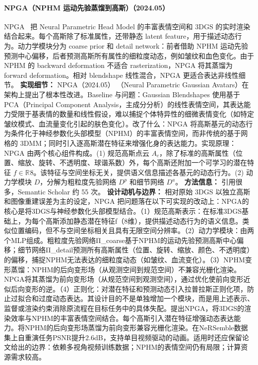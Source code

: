 \paragraph{NPGA（NPHM 运动先验蒸馏到高斯）（2024.05）}
NPGA~\cite{2405_19331} 把 Neural Parametric Head Model 的丰富表情空间和 3DGS 的实时渲染结合起来。每个高斯除了标准属性，还带静态 latent feature，用于描述动态行为。动力学模块分为 coarse prior 和 detail network：前者借助 NPHM 运动先验预测中心偏移，后者预测高斯所有属性的细粒度动态，例如皱纹和血色变化。由于 NPHM 的 backward deformation 不适合 rasterization，NPGA 将其蒸馏为 forward deformation。相对 blendshape 线性混合，NPGA 更适合表达非线性细节。
\textbf{实现细节：} NPGA（2024.05） （Neural Parametric Gaussian Avatars）在架构上提出了根本性改进。Baseline 与问题：Gaussian Blendshapes 使用基于 PCA（Principal Component Analysis，主成分分析）的线性表情空间，其表达能力受限于基表情的数量和线性假设，难以捕捉个体特异性的细微表情变化（如特定皱纹模式、血流量变化引起的肤色变化）。改了什么：NPGA 将高斯基元的动态行为条件化于神经参数化头部模型（NPHM）的丰富表情空间，而非传统的基于网格的 3DMM；同时引入逐高斯潜在特征来增强化身的表达能力。实现原理：NPGA 由两个核心组件构成。(1) 规范高斯点云 $A_c$，除了标准的高斯属性（位置、缩放、旋转、不透明度、球谐系数）外，每个高斯还附加一个可学习的潜在特征 $f \in \mathbb{R}^{}8$。该特征与空间坐标无关，提供语义信息描述各基元的动态行为。(2) 动力学模块 $D$，分解为粗粒度先验网络 $D^p$ 和细节网络 $D^a$。
\textbf{方法信息：} 引用很多，Semantic Scholar 约 55 次。
\textbf{设计动机与边界：} 相对原始 3DGS 以独立高斯和图像重建误差为主的设定，NPGA 把问题落在以下可实现的改动上：NPGA的核心是将3DGS与神经参数化头部模型结合。（1）规范高斯表示：在标准3DGS基础上，为每个高斯添加静态潜在特征f（8维），提供描述动态行为的语义信息。类似位置编码，但不与空间坐标相关且具有无限空间分辨率。（2）动力学模块：由两个MLP组成。粗粒度先验网络Π\_coarse基于NPHM的运动先验预测高斯中心偏移；细节网络Π\_detail预测所有高斯属性（位置、旋转、缩放、颜色、不透明度）的偏移，捕捉NPHM无法表达的细粒度动态（如皱纹、血流变化）。（3）NPHM变形蒸馏：NPHM的后向变形场（从观测空间到规范空间）不兼容光栅化渲染。NPGA将其蒸馏为前向变形场（从规范空间到观测空间），通过优化使前向变形近似后向变形的逆。（4）正则化：对潜在特征和预测动态引入拉普拉斯正则化项，防止过拟合和过度动态表达。其设计目的不是单独增加一个模块，而是用上述表示、监督或渲染约束消除原流程在目标任务中的具体失配。提出NPGA，将3DGS的渲染效率与NPHM的丰富表情空间结合。每个高斯引入潜在特征增强动态表达能力。将NPHM的后向变形场蒸馏为前向变形兼容光栅化渲染。在NeRSemble数据集上自重演任务PSNR提升2.6dB，支持单目视频驱动的动画。适用时还应保留论文给出的边界：依赖多视角视频训练数据；NPHM的表情空间仍有局限；计算资源需求较高。
